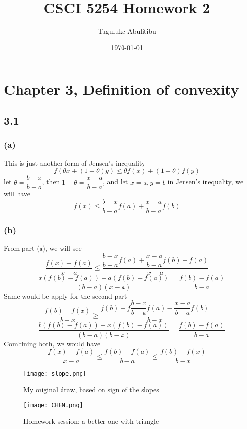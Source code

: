 \documentclass{article}
\title{CSCI 5254  Homework 2}
\author{Tuguluke Abulitibu}
\date\today
\begin{document}
\maketitle %
\section*{Chapter 3, Definition of convexity}	
\subsection*{3.1}
\subsubsection*{(a)}
This is just another form of Jensen's inequality
\[f(\theta x + (1- \theta)y) \le \theta f(x) + (1- \theta)f(y)\]
let $\theta  = \dfrac{b-x}{b-a}$, then $1 - \theta  = \dfrac{x-a}{b-a}$, and let $x = a, y = b$ in Jensen's inequality, we will have 
\[f(x) \le  \dfrac{b-x}{b-a} f(a) + \dfrac{x-a}{b-a}f(b)\]
\subsubsection*{(b)}
From part (a),  we will see
\[\dfrac{f(x)- f(a)}{x -a } \le \dfrac{\dfrac{b-x}{b-a} f(a) + \dfrac{x-a}{b-a}f(b)- f(a)}{x -a } \]
\[ = \dfrac{x(f(b) - f(a)) - a (f(b) - f(a))}{(b-a)(x-a)} = \dfrac{f(b) - f(a)}{b-a}\]
Same would be apply for the second part
\[\dfrac{f(b)- f(x)}{b -x } \ge \dfrac{f(b)- f\dfrac{b-x}{b-a} f(a) - \dfrac{x-a}{b-a}f(b)}{b -x } \]
\[ = \dfrac{b(f(b) - f(a)) - x (f(b) - f(a))}{(b-a)(b-x)} = \dfrac{f(b) - f(a)}{b-a}\]
Combining both, we would have 
\[\dfrac{f(x)- f(a)}{x -a } \le \dfrac{f(b) - f(a)}{b-a} \le \dfrac{f(b)- f(x)}{b -x } \]

\begin{figure}
\centering
\begin{minipage}{.5\textwidth}
  \centering
  \texttt{[image: slope.png]}
  \caption{My original draw, based on sign of the slopes}

\end{minipage}%
\begin{minipage}{.5\textwidth}
  \centering
  \texttt{[image: CHEN.png]}
  \caption{Homework session: a better one with triangle}

\end{minipage}
\end{figure}
\end{document}
